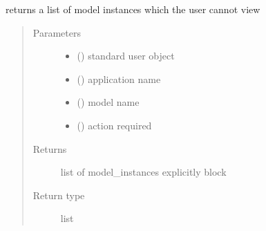 \documentclass[letterpaper,10pt,english]{sphinxmanual}
\begin{document}
\begin{fulllineitems}
\label{\detokenize{rbac:rbac.core.rbac_user_blocked_for_model}}
returns a list of model instances which the user cannot view
\begin{quote}\begin{description}
\item[{Parameters}] \leavevmode\begin{itemize}
\item {} 
 ({\hyperref[\detokenize{accounts:accounts.models.User}]{}}) \textendash{} standard user object

\item {} 
 () \textendash{} application name

\item {} 
 () \textendash{} model name

\item {} 
 () \textendash{} action required

\end{itemize}

\item[{Returns}] \leavevmode
list of model\_instances explicitly block

\item[{Return type}] \leavevmode
list

\end{description}\end{quote}

\end{fulllineitems}

\end{document}
